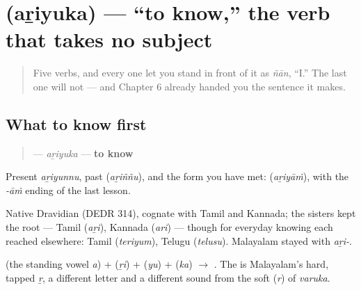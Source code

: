 \section[\texorpdfstring{\ml{അറിയുക} (aṟiyuka)}{അറിയുക (aṟiyuka)}]{ (aṟiyuka) — \textquotedblleft{}to know,\textquotedblright{} the verb that takes no subject}

\label{lesson:ML-C32-ariyuka}



\begin{quote}
Five verbs, and every one let you stand in front of it as \emph{ñān}, \textquotedblleft{}I.\textquotedblright{} The last one will not — and Chapter 6 already handed you the sentence it makes.
\end{quote}

\subsection*{What to know first}
\begin{quote}
\textbf{} — \emph{aṟiyuka} — \textbf{to know}
\end{quote}

Present \emph{aṟiyunnu}, past \textbf{} (\emph{aṟiññu}), and the form you have met: \textbf{} (\emph{aṟiyāṁ}), with the \emph{-āṁ} ending of the last lesson.

Native Dravidian (DEDR 314), cognate with Tamil and Kannada; the sisters kept the root — Tamil \textbf{} (\emph{aṟi}), Kannada \textbf{} (\emph{ari}) — though for everyday knowing each reached elsewhere: Tamil \textbf{} (\emph{teriyum}), Telugu \textbf{} (\emph{telusu}). Malayalam stayed with \emph{aṟi-}.

\begin{sounds}
\textbf{} (the standing vowel \emph{a}) + \textbf{} (\emph{ṟi}) + \textbf{} (\emph{yu}) + \textbf{} (\emph{ka}) $\to$ \textbf{}. The \textbf{} is Malayalam's hard, tapped \emph{ṟ}, a different letter and a different sound from the soft \textbf{} (\emph{r}) of \emph{varuka}.
\end{sounds}

